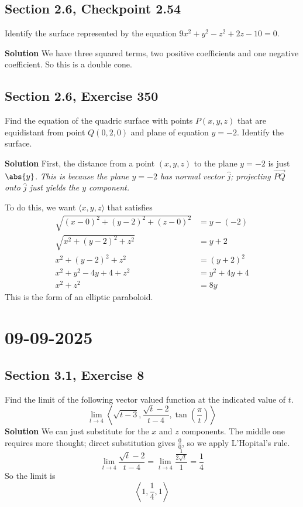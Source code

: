 \documentclass[]{mangos-musings}
\begin{document}
\subsection*{Section 2.6, Checkpoint 2.54}
Identify the surface represented by the equation $9x^2 + y^2 - z^2 + 2z - 10 = 0$.

\textbf{Solution} We have three squared terms, two positive coefficients and one negative coefficient. So this is a double cone.

\subsection*{Section 2.6, Exercise 350}
Find the equation of the quadric surface with points $P(x,y,z)$ that are equidistant from point $Q(0,2,0)$ and plane of equation $y=-2$. Identify the surface. 

\textbf{Solution} First, the distance from a point $(x, y, z)$ to the plane $y = -2$ is just $\abs{y}$. \textit{This is because the plane $y = -2$ has normal vector $\hat{j}$; projecting $\overrightarrow{PQ}$ onto $\hat{j}$ just yields the $y$ component.}

To do this, we want $\langle x, y, z \rangle$ that satisfies
\begin{align*}
  \sqrt{(x-0)^2 + (y-2)^2 + (z-0)^2} &= y - (-2) 
  \\ \sqrt{x^2 + (y-2)^2 + z^2} &= y + 2
  \\ x^2 + (y-2)^2 + z^2 &= (y+2)^2
  \\ x^2 + y^2 - 4y + 4 + z^2 &= y^2 + 4y + 4
  \\ x^2 + z^2 &= 8y
\end{align*}
This is the form of an elliptic paraboloid.

\newpage
\section*{09-09-2025}
\subsection*{Section 3.1, Exercise 8}
Find the limit of the following vector valued function at the indicated value of $t$.
\[\lim_{t\to 4}\left\langle \sqrt{t-3}, \dfrac{\sqrt{t} - 2}{t-4}, \tan\left(\dfrac{\pi}{t}\right)\right\rangle\]
\textbf{Solution} We can just substitute for the $x$ and $z$ components. The middle one requires more thought; direct substitution gives $\frac{0}{0}$, so we apply L'Hopital's rule.
\[\lim_{t\to 4} \dfrac{\sqrt{t}-2}{t-4} = \lim_{t\to 4} \dfrac{\frac{1}{2\sqrt{t}}}{1} = \dfrac{1}{4}\]
So the limit is 
\[\left\langle1, \dfrac{1}{4}, 1\right\rangle\]
\end{document}
